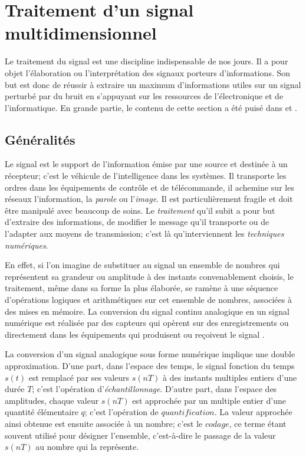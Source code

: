 \documentclass[11pt,a4paper,oneside]{book}
\begin{document}
\section{Traitement d'un signal multidimensionnel}\label{sec:3.3adapt}
Le traitement du signal est une discipline indispensable de
nos jours. Il a pour objet l'élaboration ou l'interprétation des
signaux porteurs d'informations. Son but est donc de réussir à extraire un maximum
d'informations utiles sur un signal perturbé par du bruit en
s'appuyant sur les ressources de l'électronique et de l'informatique.
En grande partie, le contenu de cette section a été puisé dans \cite{MUTIfrance} et \cite{cichocki2015tensor}.
\subsection{Généralités}
Le signal est le support de l’information émise par une source et destinée à un
récepteur; c’est le véhicule de l’intelligence dans les systèmes. Il transporte les
ordres dans les équipements de contrôle et de télécommande, il achemine sur les
réseaux l’information, la \textit{parole} ou l’\textit{image}. Il est particulièrement fragile et doit être
manipulé avec beaucoup de soins. Le \textit{traitement} qu’il subit a pour but d’extraire des
informations, de modifier le message qu’il transporte ou de l’adapter aux moyens de
transmission; c’est là qu’interviennent les \textit{techniques numériques}.\par  En effet, si l’on
imagine de substituer au signal un ensemble de nombres qui représentent sa grandeur
ou amplitude à des instants convenablement choisis, le traitement, même dans
sa forme la plus élaborée, se ramène à une séquence d’opérations logiques et arithmétiques
sur cet ensemble de nombres, associées à des mises en mémoire.
La conversion du signal continu analogique en un signal numérique est réalisée
par des capteurs qui opèrent sur des enregistrements ou directement dans les
équipements qui produisent ou reçoivent le signal \cite[p.7]{bellanger2012traitement}.
\par La conversion d’un signal analogique sous forme numérique implique une double
approximation. D’une part, dans l’espace des temps, le signal fonction du temps
$ s(t) $ est remplacé par ses valeurs $ s(nT) $ à des instants multiples entiers d’une durée
$ T $; c’est l’opération d’\textit{échantillonnage}. D’autre part, dans l’espace des amplitudes,
chaque valeur $ s(nT) $ est approchée par un multiple entier d’une quantité élémentaire
$ q $; c’est l’opération de $ quantification $. La valeur approchée ainsi obtenue est
ensuite associée à un nombre; c’est le $ codage $, ce terme étant souvent utilisé pour
désigner l’ensemble, c’est-à-dire le passage de la valeur $ s(nT) $ au nombre qui la
représente.
\end{document}
